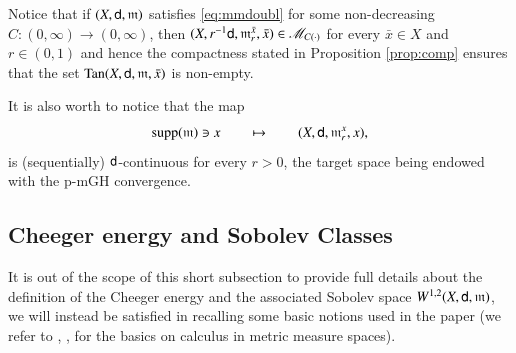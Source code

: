 \documentclass[11pt,reqno]{amsart}
\newcommand{\MM}{\mathscr{M}}
\newcommand{\supp}{\mathop{\rm supp}\nolimits}
\newcommand{\mm}{\mathfrak m}
\newcommand{\sfd}{{\sf d}}
\newcommand{\Tan}{{\rm Tan}}
\theoremstyle{definition}
\theoremstyle{remark}
\theoremstyle{remark}
\theoremstyle{remark}
\theoremstyle{remark}
\theoremstyle{remark}
\theoremstyle{remark}
\theoremstyle{remark}
\begin{document}
Notice that if $(X,\sfd,\mm)$ satisfies \eqref{eq:mmdoubl} for some non-decreasing $C:(0,\infty)\to(0,\infty)$, then $(X,r^{-1}\sfd,\mm^{\bar x}_r,\bar x)\in \MM_{C(\cdot)}$ for every $\bar x\in X$ and $r\in(0,1)$ and hence   the compactness stated in Proposition \ref{prop:comp} ensures that the set $\Tan(X,\sfd,\mm,\bar{x})$ is non-empty. 

It is also worth to notice that the map
\[
\supp(\mm) \ni x\qquad\mapsto \qquad (X,\sfd,\mm^x_r,x),
\]
is (sequentially) $\sfd$-continuous for every $r>0$, the target space being endowed with the p-mGH convergence. 
 
\subsection{Cheeger energy and Sobolev Classes}
 It is out of the scope of this short subsection  to provide full details about the definition of the Cheeger energy and the associated Sobolev space $W^{1,2}(X,\sfd,\mm)$, we will instead be satisfied in recalling some  basic notions used in the paper (we refer to \cite{AGS11a}, \cite{AGS11b}, \cite{AGS12} for the basics on calculus in metric 
measure spaces). 
\end{document}

